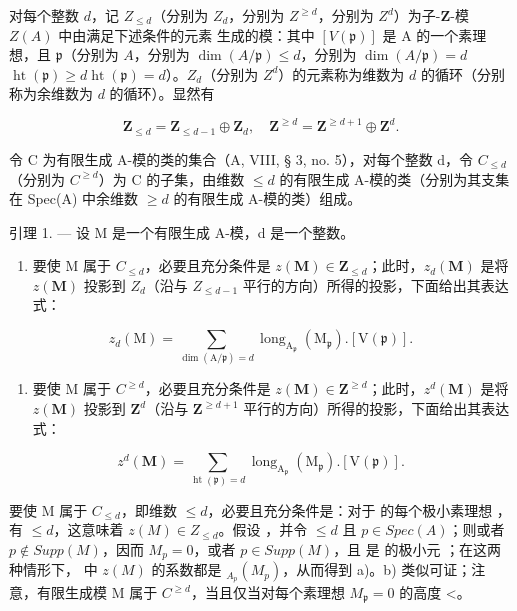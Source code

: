 对每个整数 \(d\)，记 \(Z_{\leq d}\)（分别为 \(Z_d\)，分别为 \(Z^{\geq d}\)，分别为 \(Z^d\)）为子-\(\mathbf{Z}\)-模 \(Z(A)\) 中由满足下述条件的元素  生成的模：其中 \([V(\mathfrak{p})]\) 是 A 的一个素理想，且 \(\mathfrak{p}\)（分别为 \(A\)，分别为 \(\dim(A/\mathfrak{p}) \leqslant d\)，分别为 \(\dim(A/\mathfrak{p}) = d\)\(\operatorname{ht}(\mathfrak{p}) \geqslant d\)\(\operatorname{ht}(\mathfrak{p}) = d\)）。\(Z_{d}\)（分别为 \(Z^{d}\)）的元素称为维数为 \(d\) 的循环（分别称为余维数为 \(d\) 的循环）。显然有

\[
\mathbf {Z} _ {\leqslant d} = \mathbf {Z} _ {\leqslant d - 1} \oplus \mathbf {Z} _ {d}, \quad \mathbf {Z} ^ {\geqslant d} = \mathbf {Z} ^ {\geqslant d + 1} \oplus \mathbf {Z} ^ {d}.
\]

令 C 为有限生成 A-模的类的集合（A, VIII, § 3, no. 5），对每个整数 d，令 \(C_{\leq d}\)（分别为 \(C^{\geq d}\)）为 C 的子集，由维数 \(\leq d\) 的有限生成 A-模的类（分别为其支集在 Spec(A) 中余维数 \(\geq d\) 的有限生成 A-模的类）组成。

引理 1. --- 设 M 是一个有限生成 A-模，d 是一个整数。

\begin{enumerate}
\def\labelenumi{\alph{enumi})}
\tightlist
\item
  要使 M 属于 \(C_{\leq d}\)，必要且充分条件是 \(z(\mathbf{M}) \in \mathbf{Z}_{\leq d}\)；此时，\(z_{d}(\mathbf{M})\) 是将 \(z(\mathbf{M})\) 投影到 \(Z_{d}\)（沿与 \(Z_{\leq d-1}\) 平行的方向）所得的投影，下面给出其表达式：
\end{enumerate}

\[
z _ {d} (\mathrm{M}) = \sum _ {\dim (\mathrm{A} / \mathfrak {p}) = d} \operatorname{long} _ {\mathrm{A} _ {\mathfrak {p}}} (\mathrm{M} _ {\mathfrak {p}}). [ \mathrm{V} (\mathfrak {p}) ].
\]

\begin{enumerate}
\def\labelenumi{\alph{enumi})}
\setcounter{enumi}{1}
\tightlist
\item
  要使 M 属于 \(C^{\geq d}\)，必要且充分条件是 \(z(\mathbf{M})\in\mathbf{Z}^{\geq d}\)；此时，\(z^{d}(\mathbf{M})\) 是将 \(z(\mathbf{M})\) 投影到 \(\mathbf{Z}^{d}\)（沿与 \(\mathbf{Z}^{\geq d+1}\) 平行的方向）所得的投影，下面给出其表达式：
\end{enumerate}

\[
z ^ {d} (\mathbf {M}) = \sum _ {\operatorname{ht} (\mathfrak {p}) = d} \operatorname{long} _ {\mathrm{A} _ {\mathfrak {p}}} (\mathrm{M} _ {\mathfrak {p}}). [ \mathrm{V} (\mathfrak {p}) ].
\]

要使 M 属于 \(C_{\leq d}\)，即维数 \(\leq d\)，必要且充分条件是：对于  的每个极小素理想  ，有 \(\leq d\)，这意味着 \(z(M) \in Z_{\leq d}\)。假设  ，并令 \(\leq d\) 且 \(p \in Spec(A)\)；则或者 \(p \notin Supp(M)\)，因而 \(M_p = 0\)，或者 \(p \in Supp(M)\)，且 { 是  的极小元 }；在这两种情形下，{} 中 \(z(M)\) 的系数都是 \(_{A_p}(M_p)\)，从而得到 a)。b) 类似可证；注意，有限生成模 M 属于 \(C^{\geq d}\)，当且仅当对每个素理想 \(M_{\mathfrak{p}} = 0\) 的高度 \textless{}。

